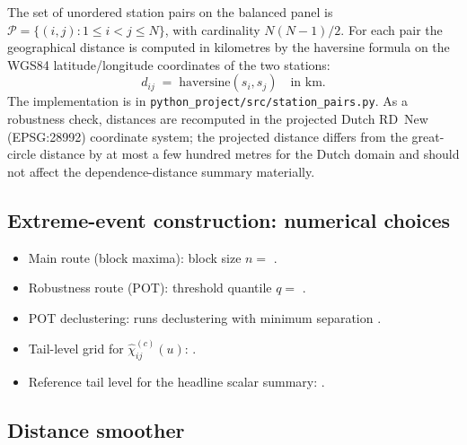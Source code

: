 The set of unordered station pairs on the balanced panel is
\(\mathcal{P} = \{(i,j) : 1 \le i < j \le N\}\), with cardinality
\(N(N-1)/2\). For each pair the geographical distance is computed
in kilometres by the haversine formula on the WGS84
latitude/longitude coordinates of the two stations:
\[
    d_{ij} \;=\;
    \mathrm{haversine}(s_i, s_j) \quad \text{in km}.
\]
The implementation is in
\texttt{python\_project/src/station\_pairs.py}. As a robustness
check, distances are recomputed in the projected Dutch RD~New
(EPSG:28992) coordinate system; the projected distance differs from
the great-circle distance by at most a few hundred metres for the
Dutch domain and should not affect the dependence-distance summary
materially.

\subsection{Extreme-event construction: numerical
choices}\label{sec:emp-extremes}

\begin{itemize}
    \item Main route (block maxima): block size
          \(n =\)
          .
    \item Robustness route (POT): threshold quantile
          \(q =\)
          .
    \item POT declustering: runs declustering with minimum
          separation
          .
    \item Tail-level grid for
          \(\widehat\chi_{ij}^{(c)}(u)\):
          .
    \item Reference tail level for the headline scalar summary:
          .
\end{itemize}

\subsection{Distance smoother}\label{sec:emp-smoother}

